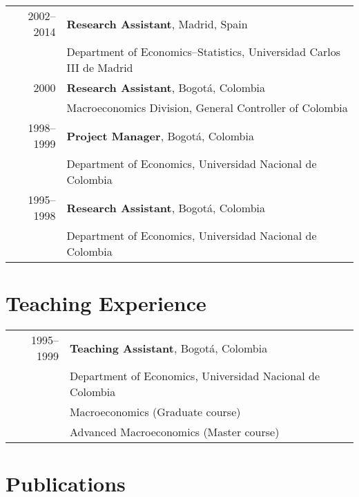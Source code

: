 \documentclass[11pt]{article}\usepackage[]{graphicx}\usepackage[]{color}
\begin{document}
\begin{tabular}{rl{-2cm}}

2002--2014 &  \textbf{Research Assistant}, Madrid, Spain\\
\vspace{5pt}& Department of Economics--Statistics, Universidad Carlos III de Madrid\\

2000 & \textbf{Research Assistant}, Bogotá, Colombia\\
\vspace{5pt}& Macroeconomics Division, General Controller of Colombia\\

1998--1999 & \textbf{Project Manager}, Bogotá, Colombia\\
\vspace{5pt}& Department of Economics, Universidad Nacional de Colombia\\

1995--1998 & \textbf{Research Assistant}, Bogotá, Colombia\\
\vspace{5pt}& Department of Economics, Universidad Nacional de Colombia}\\

\end{tabular}
\vspace{10pt}

\clearpage

\section{Teaching Experience} 

\begin{tabular}{rl{-2cm}}

1995--1999 & \textbf{Teaching Assistant}, Bogotá, Colombia\\
& Department of Economics, Universidad Nacional de Colombia\\
& Macroeconomics (Graduate course)\\
& Advanced Macroeconomics (Master course)\\

\end{tabular}
\vspace{10pt}


\section{Publications}
\end{document}
